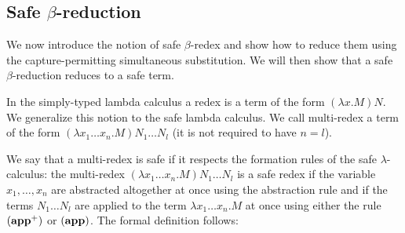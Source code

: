 \subsection{Safe $\beta$-reduction}

We now introduce the notion of safe $\beta$-redex and show how to
reduce them using the capture-permitting simultaneous substitution.
We will then show that a safe $\beta$-reduction reduces to a safe
term.


In the simply-typed lambda calculus a redex is a term of the form $(\lambda x . M) N$.
We generalize this notion to the safe lambda calculus. We call multi-redex a term of the form
$(\lambda x_1 \ldots x_n . M) N_1 \ldots N_l$ (it is not required to have $n=l$).


We say that a multi-redex is safe if it respects the formation rules
of the safe $\lambda$-calculus: the multi-redex $(\lambda x_1 \ldots
x_n . M) N_1 \ldots N_l$ is a safe redex if the variable
$x_1,\ldots,x_n$ are abstracted altogether at once using the
abstraction rule and if the terms $N_1 \ldots N_l$ are applied to
the term $\lambda x_1 \ldots x_n . M$ at once using either the rule
$\mathbf{(app^+)}$ or $\mathbf{(app)}$. The formal definition
follows:

